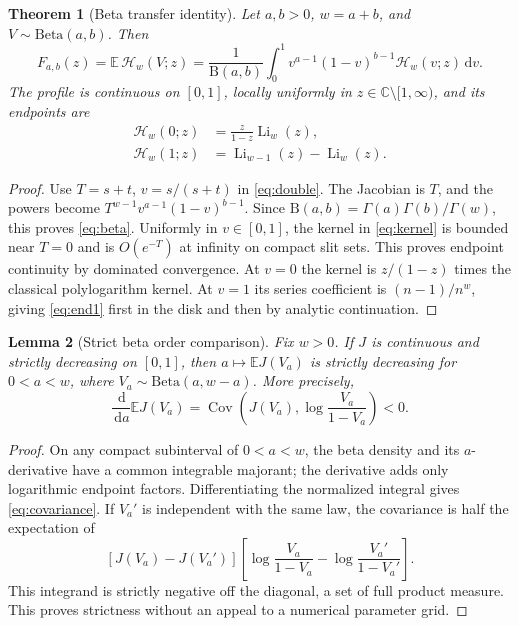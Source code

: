 \documentclass[11pt]{article}
\numberwithin{equation}{section}
\newtheorem{theorem}{Theorem}[section]
\newtheorem{lemma}[theorem]{Lemma}
\theoremstyle{definition}\newtheorem{definition}[theorem]{Definition}
\theoremstyle{remark}\newtheorem{remark}[theorem]{Remark}
\DeclareMathOperator{\Li}{Li}
\DeclareMathOperator{\Cov}{Cov}
\newcommand{\dd}{\,\mathrm d}
\newcommand{\E}{\mathbb E}
\newcommand{\C}{\mathbb C}
\newcommand{\cut}{\C\setminus[1,\infty)}
\newcommand{\HH}{\mathcal H}
\newcommand{\BB}{\mathrm B}
\begin{document}
\begin{theorem}[Beta transfer identity]\label{thm:beta}
Let $a,b>0$, $w=a+b$, and $V\sim\mathrm{Beta}(a,b)$. Then
\begin{equation}\label{eq:beta}
 F_{a,b}(z)=\E\,\HH_w(V;z)
 =\frac1{\BB(a,b)}\int_0^1v^{a-1}(1-v)^{b-1}\HH_w(v;z)\dd v.
\end{equation}
The profile is continuous on $[0,1]$, locally uniformly in $z\in\cut$,
and its endpoints are
\begin{align}
 \HH_w(0;z)&=\frac z{1-z}\Li_w(z),\label{eq:end0}\\
 \HH_w(1;z)&=\Li_{w-1}(z)-\Li_w(z).\label{eq:end1}
\end{align}
\end{theorem}
\begin{proof}
Use $T=s+t$, $v=s/(s+t)$ in \eqref{eq:double}. The Jacobian is $T$,
and the powers become $T^{w-1}v^{a-1}(1-v)^{b-1}$. Since
$\BB(a,b)=\Gamma(a)\Gamma(b)/\Gamma(w)$, this proves \eqref{eq:beta}.
Uniformly in $v\in[0,1]$, the kernel in \eqref{eq:kernel} is bounded
near $T=0$ and is $O(e^{-T})$ at infinity on compact slit sets. This
proves endpoint continuity by dominated convergence. At $v=0$ the
kernel is $z/(1-z)$ times the classical polylogarithm kernel. At $v=1$
its series coefficient is $(n-1)/n^w$, giving \eqref{eq:end1} first in
the disk and then by analytic continuation.
\end{proof}

\begin{lemma}[Strict beta order comparison]\label{lem:betaorder}
Fix $w>0$. If $J$ is continuous and strictly decreasing on $[0,1]$, then
$a\mapsto\E J(V_a)$ is strictly decreasing for $0<a<w$, where
$V_a\sim\mathrm{Beta}(a,w-a)$. More precisely,
\begin{equation}\label{eq:covariance}
 \frac{\dd}{\dd a}\E J(V_a)
 =\Cov\left(J(V_a),\log\frac{V_a}{1-V_a}\right)<0.
\end{equation}
\end{lemma}
\begin{proof}
On any compact subinterval of $0<a<w$, the beta density and its
$a$-derivative have a common integrable majorant; the derivative adds
only logarithmic endpoint factors. Differentiating the normalized
integral gives \eqref{eq:covariance}. If $V_a'$ is independent with the
same law, the covariance is half the expectation of
\[
 [J(V_a)-J(V_a')]
 \left[\log\frac{V_a}{1-V_a}-\log\frac{V_a'}{1-V_a'}\right].
\]
This integrand is strictly negative off the diagonal, a set of full
product measure. This proves strictness without an appeal to a
numerical parameter grid.
\end{proof}
\end{document}
